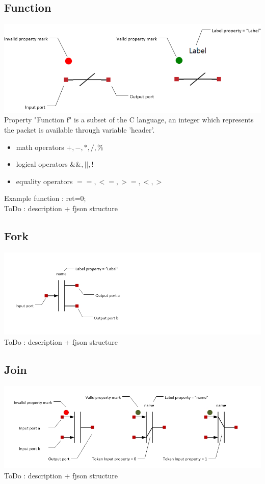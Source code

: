 \documentclass[a4paper,11pt,final]{article}
\begin{document}
\subsection{Function}
\includegraphics[width=1.0\textwidth]{function}
\\Property "Function f" is a subset of the C language, an integer which represents the packet is available through variable 'header'. 
\begin{itemize}
\item math operators $+,-,*,/,\%$
\item logical operators $\&\&,||,!$
\item equality operators $==,<=,>=,<,>$
\end{itemize} 
Example function : ret=0;
\\ToDo : description + fjson structure
\subsection{Fork}
\includegraphics[width=1.0\textwidth]{fork}
\\ToDo : description + fjson structure
\subsection{Join}
\includegraphics[width=1.0\textwidth]{join}
\\ToDo : description + fjson structure
\end{document}
